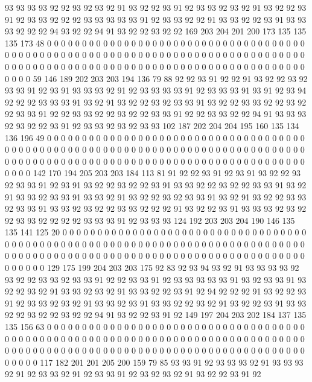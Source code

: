 93 93 93 93 92 92 93 92 93 92 91 93 92 92 93 91 92 93 93 92
93 92 91 93 92 92 93 91 92 93 93 92 92 92 93 93 93 93 93 91
92 93 93 92 92 91 93 93 92 92 93 91 93 93 93 92 92 92 94 93
92 92 94 91 93 92 92 93 92 92 169 203 204 201 200 173 135 135 135 173
48 0 0 0 0 0 0 0 0 0 0 0 0 0 0 0 0 0 0 0
0 0 0 0 0 0 0 0 0 0 0 0 0 0 0 0 0 0 0 0
0 0 0 0 0 0 0 0 0 0 0 0 0 0 0 0 0 0 0 0
0 0 0 0 0 0 0 0 0 0 0 0 0 0 0 0 0 0 0 0
0 0 0 0 0 0 0 0 0 0 0 0 0 0 0 0 0 0 0 0
0 0 0 0 0 0 0 0 0 0 0 0 0 0 0 0 0 0 0 0
0 0 0 0 0 0 0 0 59 146 189 202 203 203 194 136 79 88 92 92
93 91 92 92 91 93 92 92 93 92 93 93 91 92 93 91 93 93 93 92
91 92 93 93 93 93 91 92 93 93 93 91 93 91 92 93 94 92 92 92
93 93 93 91 93 92 91 93 92 92 93 92 93 93 91 93 92 92 93 93
92 92 93 92 92 93 93 91 92 92 93 93 92 92 93 92 92 93 93 91
92 92 93 93 92 92 94 91 93 93 93 92 93 92 92 93 91 92 93 93
92 93 92 93 93 102 187 202 204 204 195 160 135 134 136 196 49 0 0 0
0 0 0 0 0 0 0 0 0 0 0 0 0 0 0 0 0 0 0 0
0 0 0 0 0 0 0 0 0 0 0 0 0 0 0 0 0 0 0 0
0 0 0 0 0 0 0 0 0 0 0 0 0 0 0 0 0 0 0 0
0 0 0 0 0 0 0 0 0 0 0 0 0 0 0 0 0 0 0 0
0 0 0 0 0 0 0 0 0 0 0 0 0 0 0 0 0 0 0 0
0 0 0 0 0 0 0 0 0 0 0 0 0 0 0 0 0 0 0 0
0 0 0 0 142 170 194 205 203 203 184 113 81 91 92 92 93 91 92 93
91 93 92 92 93 92 93 93 91 92 93 91 93 92 92 93 92 92 93 91
93 93 92 92 93 92 92 93 93 91 93 92 91 93 93 92 93 93 91 93
93 92 91 93 92 92 93 92 93 93 91 93 92 91 93 92 92 93 93 92
93 93 91 93 93 92 93 92 92 93 93 92 92 92 91 93 92 92 93 91
93 93 93 92 93 92 92 93 93 92 92 92 92 93 93 93 91 92 93 93
93 124 192 203 203 204 190 146 135 135 141 125 20 0 0 0 0 0 0 0
0 0 0 0 0 0 0 0 0 0 0 0 0 0 0 0 0 0 0 0
0 0 0 0 0 0 0 0 0 0 0 0 0 0 0 0 0 0 0 0
0 0 0 0 0 0 0 0 0 0 0 0 0 0 0 0 0 0 0 0
0 0 0 0 0 0 0 0 0 0 0 0 0 0 0 0 0 0 0 0
0 0 0 0 0 0 0 0 0 0 0 0 0 0 0 0 0 0 0 0
0 0 0 0 0 0 0 0 0 0 0 0 0 0 0 0 0 0 0 0
129 175 199 204 203 203 175 92 83 92 93 94 93 92 91 93 93 93 93 92
93 92 92 93 93 92 93 93 91 92 92 93 93 91 92 93 93 93 93 93
91 93 92 93 93 91 93 92 92 93 92 91 93 93 92 93 92 91 93 93
92 92 93 91 92 94 92 92 92 91 93 92 92 93 91 92 93 93 92 93
92 91 93 93 92 93 91 93 93 92 92 93 92 91 93 92 92 93 91 93
93 92 92 93 92 92 93 92 92 94 91 93 92 92 93 91 92 149 197 204
203 202 184 137 135 135 156 63 0 0 0 0 0 0 0 0 0 0 0 0
0 0 0 0 0 0 0 0 0 0 0 0 0 0 0 0 0 0 0 0
0 0 0 0 0 0 0 0 0 0 0 0 0 0 0 0 0 0 0 0
0 0 0 0 0 0 0 0 0 0 0 0 0 0 0 0 0 0 0 0
0 0 0 0 0 0 0 0 0 0 0 0 0 0 0 0 0 0 0 0
0 0 0 0 0 0 0 0 0 0 0 0 0 0 0 0 0 0 0 0
0 0 0 0 0 0 0 0 0 0 0 0 0 0 0 0 117 182 201 201
205 200 159 79 85 93 93 91 92 93 93 93 92 91 93 93 93 92 91 92
93 93 92 91 92 93 93 91 92 93 92 93 92 91 93 92 92 93 91 92
